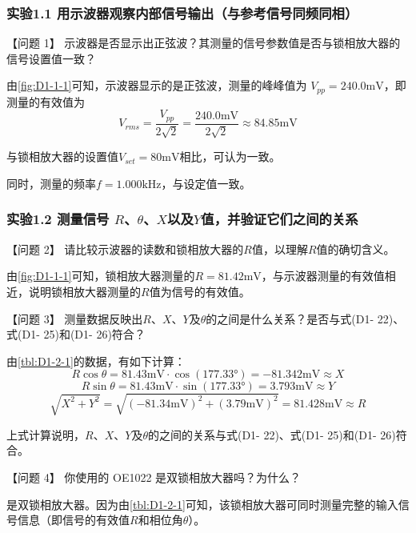 \documentclass[dvipsnames, svgnames,a4paper,11pt]{article}
\begin{document}
	\subsubsection*{实验1.1 \quad 用示波器观察内部信号输出（与参考信号同频同相）}
		
		【问题 1】 示波器是否显示出正弦波？其测量的信号参数值是否与锁相放大器的信号设置值一致？

		由\cref{fig:D1-1-1}可知，示波器显示的是正弦波，测量的峰峰值为 $V_{pp} = 240.0 \mathrm{mV}$，即测量的有效值为
		\[
			V_{rms} = \frac{V_{pp}}{2 \sqrt{2}} = \frac{240.0 \mathrm{mV}}{2 \sqrt{2}} \approx 84.85 \mathrm{mV}
		\]

		与锁相放大器的设置值$V_{set} = 80 \mathrm{mV}$相比，可认为一致。

		同时，测量的频率$f = 1.000 \mathrm{kHz}$，与设定值一致。




	\subsubsection*{实验1.2 \quad 测量信号 $R$、$\theta$、$X$以及$Y$值，并验证它们之间的关系}

		【问题 2】 请比较示波器的读数和锁相放大器的$R$值，以理解$R$值的确切含义。

		由\cref{fig:D1-1-1}可知，锁相放大器测量的$R = 81.42 \mathrm{mV}$，与示波器测量的有效值相近，说明锁相放大器测量的$R$值为信号的有效值。


		\vspace{0.05\textwidth} %


		【问题 3】 测量数据反映出$R$、$X$、$Y$及$\theta$的之间是什么关系？是否与式(D1- 22)、式(D1- 25)和(D1- 26)符合？

		由\cref{tbl:D1-2-1}的数据，有如下计算：
		\[
			R \cos\theta = 81.43 \mathrm{mV} \cdot \cos(177.33°) = -81.342 \mathrm{mV} \approx X 
		\]
		\[
			R \sin\theta = 81.43 \mathrm{mV} \cdot \sin(177.33°) = 3.793 \mathrm{mV} \approx Y 
		\]
		\[
			\sqrt{X^2 + Y^2} = \sqrt{(-81.34 \mathrm{mV})^2 + (3.79 \mathrm{mV})^2} = 81.428 \mathrm{mV} \approx R
		\]

		上式计算说明，$R$、$X$、$Y$及$\theta$的之间的关系与式(D1- 22)、式(D1- 25)和(D1- 26)符合。


		\vspace{0.05\textwidth} %


		【问题 4】 你使用的 OE1022 是双锁相放大器吗？为什么？

		是双锁相放大器。因为由\cref{tbl:D1-2-1}可知，该锁相放大器可同时测量完整的输入信号信息（即信号的有效值$R$和相位角$\theta$）。
\end{document}
